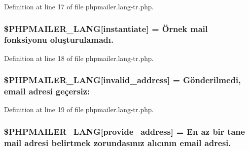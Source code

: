 Definition at line 17 of file phpmailer.\+lang-\/tr.\+php.

\subsubsection[{\texorpdfstring{\$\+P\+H\+P\+M\+A\+I\+L\+E\+R\+\_\+\+L\+A\+NG}{$PHPMAILER_LANG}}]{\setlength{\rightskip}{0pt plus 5cm}\$P\+H\+P\+M\+A\+I\+L\+E\+R\+\_\+\+L\+A\+NG\mbox{[}\textquotesingle{}instantiate\textquotesingle{}\mbox{]} = \textquotesingle{}Örnek mail fonksiyonu oluşturulamadı.\textquotesingle{}}\hypertarget{phpmailer_8lang-tr_8php_ad58dde16780f4770ccf4dd282ea1f5ad}{}\label{phpmailer_8lang-tr_8php_ad58dde16780f4770ccf4dd282ea1f5ad}


Definition at line 18 of file phpmailer.\+lang-\/tr.\+php.

\subsubsection[{\texorpdfstring{\$\+P\+H\+P\+M\+A\+I\+L\+E\+R\+\_\+\+L\+A\+NG}{$PHPMAILER_LANG}}]{\setlength{\rightskip}{0pt plus 5cm}\$P\+H\+P\+M\+A\+I\+L\+E\+R\+\_\+\+L\+A\+NG\mbox{[}\textquotesingle{}invalid\+\_\+address\textquotesingle{}\mbox{]} = \textquotesingle{}Gönderilmedi, {\bf email} adresi geçersiz\+: \textquotesingle{}}\hypertarget{phpmailer_8lang-tr_8php_a42d61bcea4c79599ecb44fd062f54d47}{}\label{phpmailer_8lang-tr_8php_a42d61bcea4c79599ecb44fd062f54d47}


Definition at line 19 of file phpmailer.\+lang-\/tr.\+php.

\subsubsection[{\texorpdfstring{\$\+P\+H\+P\+M\+A\+I\+L\+E\+R\+\_\+\+L\+A\+NG}{$PHPMAILER_LANG}}]{\setlength{\rightskip}{0pt plus 5cm}\$P\+H\+P\+M\+A\+I\+L\+E\+R\+\_\+\+L\+A\+NG\mbox{[}\textquotesingle{}provide\+\_\+address\textquotesingle{}\mbox{]} = \textquotesingle{}En az bir tane mail adresi belirtmek zorundasınız alıcının {\bf email} adresi.\textquotesingle{}}\hypertarget{phpmailer_8lang-tr_8php_a8b97897c2406b7392b056f375feeefbb}{}\label{phpmailer_8lang-tr_8php_a8b97897c2406b7392b056f375feeefbb}


